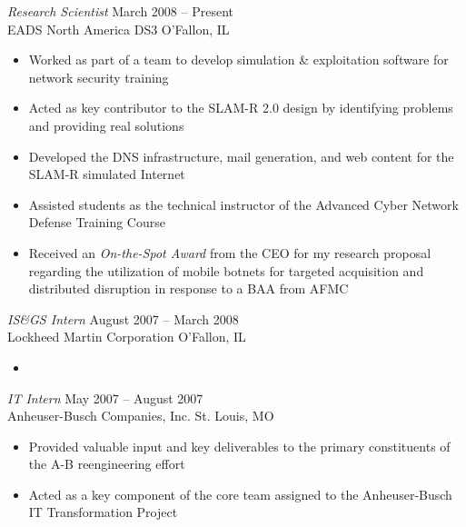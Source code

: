 \documentclass[margin,line]{resume}
\begin{document}
\begin{resume}
{\sl Research Scientist}            \hfill  March 2008 -- Present\\
EADS North America DS3              \hfill  O'Fallon, IL
\begin{itemize} \itemsep -2pt %
\small\item Worked as part of a team to develop simulation \& exploitation software for network security training
\small\item Acted as key contributor to the SLAM-R 2.0 design by identifying problems and providing real solutions
\small\item Developed the DNS infrastructure, mail generation, and web content for the SLAM-R simulated Internet
\small\item Assisted students as the technical instructor of the Advanced Cyber Network Defense Training Course
\small\item Received an {\sl On-the-Spot Award} from the CEO for my research proposal regarding the utilization of
            mobile botnets for targeted acquisition and distributed disruption in response to a BAA from AFMC

\end{itemize}

{\sl IS\&GS Intern}                 \hfill  August 2007 -- March 2008\\
Lockheed Martin Corporation         \hfill  O'Fallon, IL
\begin{itemize} \itemsep -2pt %
\small\item
\end{itemize}

{\sl IT Intern}                     \hfill  May 2007 -- August 2007\\
Anheuser-Busch Companies, Inc.      \hfill  St. Louis, MO
\begin{itemize} \itemsep -2pt %
\small\item Provided valuable input and key deliverables to the primary constituents of the A-B reengineering effort
\small\item Acted as a key component of the core team assigned to the Anheuser-Busch IT Transformation Project
\end{itemize}


\end{resume}
\end{document}
